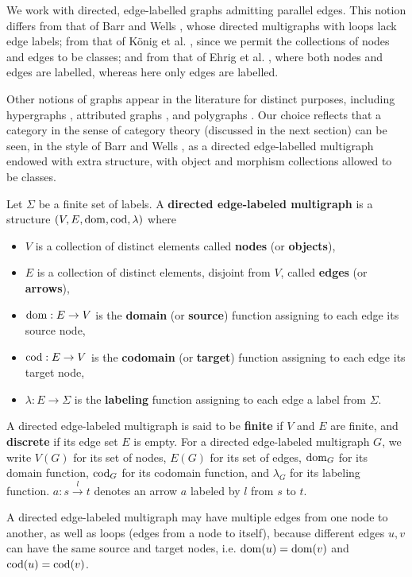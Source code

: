 We work with directed, edge-labelled graphs admitting parallel edges. This notion differs from that of Barr and Wells \cite{barr1990category}, whose directed multigraphs with loops lack edge labels; from that of König et al. \cite{konig2018atutorial}, since we permit the collections of nodes and edges to be classes; and from that of Ehrig et al. \cite{ehrig1997handbook1}, where both nodes and edges are labelled, whereas here only edges are labelled.

Other notions of graphs appear in the literature for distinct purposes, including hypergraphs \cite{plump1993hypergraph}, attributed graphs \cite{ehrig2006fundamentals}, and polygraphs \cite{ara2023polygraphs}. Our choice reflects that a category in the sense of category theory (discussed in the next section) can be seen, in the style of Barr and Wells \cite{barr1990category}, as a directed edge-labelled multigraph endowed with extra structure, with object and morphism collections allowed to be classes.

\begin{definition}
    \label{def:graph}
     Let \(\Sigma\) be a finite set of labels. A \textbf{directed edge-labeled multigraph} is a structure \((V, E, \operatorname{dom}, \operatorname{cod},\lambda)\) where
    \begin{itemize}
        \item $V$ is a collection of distinct elements called \textbf{nodes} (or \textbf{objects}),
        \item $E$ is a collection of distinct elements, disjoint from $V$, called \textbf{edges} (or \textbf{arrows}),
        \item $\operatorname{dom}: E \to V$ is the \textbf{domain} (or \textbf{source}) function assigning to each edge its source node,
        \item $\operatorname{cod}: E \to V$ is the \textbf{codomain} (or \textbf{target}) function assigning to each edge its target node,
        \item $\lambda: E \to \Sigma$ is the \textbf{labeling} function assigning to each edge a label from $\Sigma$.
    \end{itemize}
    A directed edge-labeled multigraph is said to be \textbf{finite} if $V$ and $E$ are finite, and \textbf{discrete} if its edge set \(E\) is empty.
    For a directed edge-labeled multigraph \( G \), we write \( V(G) \) for its set of nodes, \( E(G) \) for its set of edges, \( \operatorname{dom}_G \) for its domain function, \( \operatorname{cod}_G \) for its codomain function, and \( \lambda_G \) for its labeling function. $a : s\overset{l}{\rightarrow} t$ denotes an arrow $a$ labeled by $l$ from $s$ to $t$.
\end{definition}
A directed edge-labeled multigraph may have multiple edges from one node to another, as well as loops (edges from a node to itself), because different edges $u,v$ can have the same source and target nodes, i.e. $\operatorname{dom}(u) = \operatorname{dom}(v)$ and $\operatorname{cod}(u) = \operatorname{cod}(v)$.

